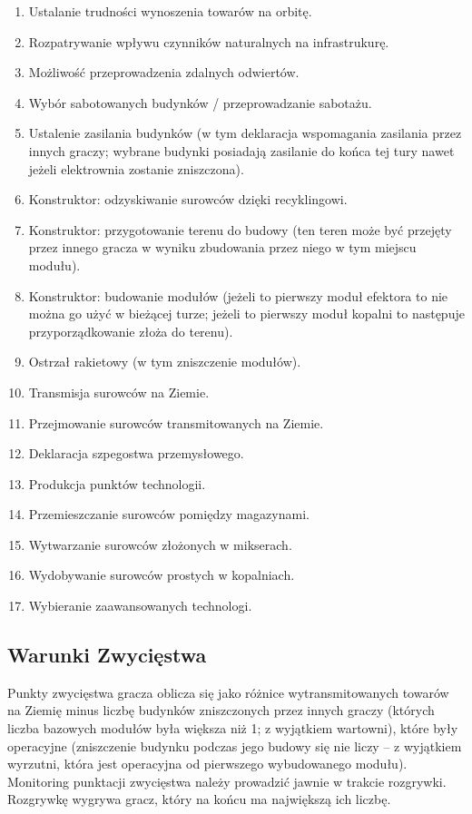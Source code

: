 \documentclass[11pt,a4paper]{article}
\begin{document}
\begin{enumerate}
  \setlength{\parskip}{0pt}
  \setlength{\itemsep}{0pt plus 1pt}
\item Ustalanie trudności wynoszenia towarów na orbitę.
\item Rozpatrywanie wpływu czynników naturalnych na infrastrukurę.
\item Możliwość przeprowadzenia zdalnych odwiertów.
\item Wybór sabotowanych budynków / przeprowadzanie sabotażu.
\item Ustalenie zasilania budynków (w tym deklaracja wspomagania zasilania przez innych graczy; wybrane budynki posiadają zasilanie do końca tej tury nawet jeżeli elektrownia zostanie zniszczona).
\item Konstruktor: odzyskiwanie surowców dzięki recyklingowi.
\item Konstruktor: przygotowanie terenu do budowy (ten teren może być przejęty przez innego gracza w wyniku zbudowania przez niego w tym miejscu modułu).
\item Konstruktor: budowanie modułów (jeżeli to pierwszy moduł efektora to nie można go użyć w bieżącej turze; jeżeli to pierwszy moduł kopalni to następuje przyporządkowanie złoża do terenu).
\item Ostrzał rakietowy (w tym zniszczenie modułów).
\item Transmisja surowców na Ziemie.
\item Przejmowanie surowców transmitowanych na Ziemie.
\item Deklaracja szpegostwa przemysłowego.
\item Produkcja punktów technologii.
\item Przemieszczanie surowców pomiędzy magazynami.
\item Wytwarzanie surowców złożonych w mikserach.
\item Wydobywanie surowców prostych w kopalniach.
\item Wybieranie zaawansowanych technologi.
\end{enumerate}

\subsection{Warunki Zwycięstwa}

Punkty zwycięstwa gracza oblicza się jako różnice wytransmitowanych towarów na Ziemię minus liczbę budynków zniszczonych przez innych graczy (których liczba bazowych modułów była większa niż 1; z wyjątkiem wartowni), które były operacyjne (zniszczenie budynku podczas jego budowy się nie liczy -- z wyjątkiem wyrzutni, która jest operacyjna od pierwszego wybudowanego modułu). Monitoring punktacji zwycięstwa należy prowadzić jawnie w trakcie rozgrywki. Rozgrywkę wygrywa gracz, który na końcu ma największą ich liczbę.
\end{document}
